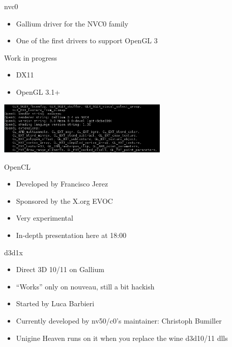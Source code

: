 \documentclass[11pt,english,compress]{beamer}
\begin{document}
		\begin{frame}
			\begin{block}{nvc0}
				\begin{itemize}
					\item Gallium driver for the NVC0 family
					\item One of the first drivers to support OpenGL 3
				\end{itemize}
			\end{block}
			\begin{block}{Work in progress}
				\begin{itemize}
					\item DX11
					\item OpenGL 3.1+
				\end{itemize}
			\end{block}

			\begin{center}
				\includegraphics[height=2.5cm]{imgs/opengl3.png}
			\end{center}
		\end{frame}
		\begin{frame}
			\begin{block}{OpenCL}
				\begin{itemize}
					\item Developed by Francisco Jerez
					\item Sponsored by the X.org EVOC
					\item Very experimental
					\item In-depth presentation here at 18:00
				\end{itemize}
			\end{block}

			\begin{block}{d3d1x}
				\begin{itemize}
					\item Direct 3D 10/11 on Gallium
					\item ``Works'' only on nouveau, still a bit hackish
					\item Started by Luca Barbieri
					\item Currently developed by nv50/c0's maintainer: Christoph Bumiller
					\item Unigine Heaven runs on it when you replace the wine d3d10/11 dlls
				\end{itemize}
			\end{block}
		\end{frame}
\end{document}
